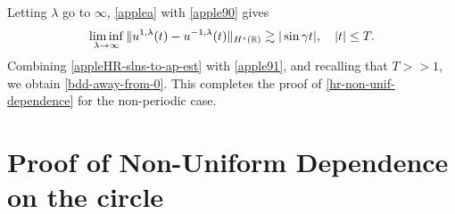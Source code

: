 %
%
%
%
Letting $\lambda$ go to $\infty$,  \cref{applea}
with \eqref{apple90}  gives
%
%
%
%
\begin{equation} \label{apple91}
\liminf_{\lambda \to\infty}
\|
u^{1,\lambda}(t)
-
u^{- 1,\lambda}(t)
\|_{H^s(\mathbb{R})}
\gtrsim
|\sin \gamma t|, \quad |t| \le T.
\end{equation}
%
%
Combining \eqref{appleHR-slns-to-ap-est} with \eqref{apple91}, and 
recalling that $T >>1$, we obtain \eqref{bdd-away-from-0}. This completes 
the proof of \cref{hr-non-unif-dependence} for the
non-periodic case. \qquad \qedsymbol
%
%
%
%
%
%
%
%
\section{Proof of Non-Uniform Dependence 
on the circle}
\label{sec:3}

